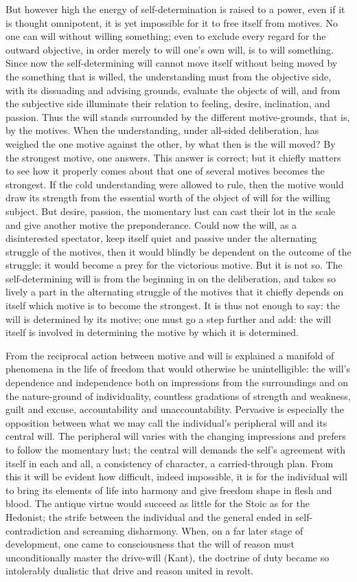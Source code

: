 \documentclass[12pt]{book}
\begin{document}
But however high the energy of self-determination is raised to a power, even if it is thought
omnipotent, it is yet impossible for it to free itself from motives. No one can will without
willing something; even to exclude every regard for the outward objective, in order merely to
will one's own will, is to will something. Since now the self-determining will cannot move itself
without being moved by the something that is willed, the understanding must from the objective
side, with its dissuading and advising grounds, evaluate the objects of will, and from the
subjective side illuminate their relation to feeling, desire, inclination, and passion. Thus the
will stands surrounded by the different motive-grounds, that is, by the motives. When the
understanding, under all-sided deliberation, has weighed the one motive against the other, by
what then is the will moved? By the strongest motive, one answers. This answer is correct; but
it chiefly matters to see how it properly comes about that one of several motives becomes the
strongest. If the cold understanding were allowed to rule, then the motive would draw its
strength from the essential worth of the object of will for the willing subject. But desire,
passion, the momentary lust can cast their lot in the scale and give another motive the
preponderance. Could now the will, as a disinterested spectator, keep itself quiet and passive
under the alternating struggle of the motives, then it would blindly be dependent on the outcome
of the struggle; it would become a prey for the victorious motive. But it is not so. The
self-determining will is from the beginning in on the deliberation, and takes so lively a part in
the alternating struggle of the motives that it chiefly depends on itself which motive is to
become the strongest. It is thus not enough to say: the will is determined by its motive; one
must go a step further and add: the will itself is involved in determining the motive by which
it is determined.

From the reciprocal action between motive and will is explained a manifold of phenomena in the
life of freedom that would otherwise be unintelligible: the will's dependence and independence
both on impressions from the surroundings and on the nature-ground of individuality, countless
gradations of strength and weakness, guilt and excuse, accountability and unaccountability.
Pervasive is especially the opposition between what we may call the individual's peripheral will
and its central will. The peripheral will varies with the changing impressions and prefers to
follow the momentary lust; the central will demands the self's agreement with itself in each and
all, a consistency of character, a carried-through plan. From this it will be evident how
difficult, indeed impossible, it is for the individual will to bring its elements of life into
harmony and give freedom shape in flesh and blood. The antique virtue would succeed as little for
the Stoic as for the Hedonist; the strife between the individual and the general ended in
self-contradiction and screaming disharmony. When, on a far later stage of development, one came
to consciousness that the will of reason must unconditionally master the drive-will (Kant), the
doctrine of duty became so intolerably dualistic that drive and reason united in revolt.
\end{document}
